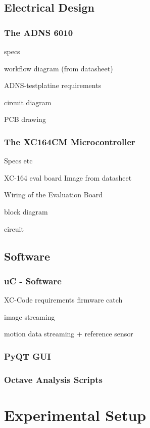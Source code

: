 \documentclass[12pt,a4paper]{article}
\begin{document}
\subsection{Electrical Design}

\subsubsection{The ADNS 6010}

specs

workflow diagram (from datasheet)

ADNS-testplatine
  requirements

  circuit diagram

  PCB drawing

\subsubsection{The XC164CM Microcontroller}

Specs etc

XC-164 eval board 
  Image from datasheet

Wiring of the Evaluation Board

  block diagram

  circuit

\subsection{Software}

\subsubsection{uC - Software}

  XC-Code
    requirements
    firmware catch

    image streaming

    motion data streaming
      + reference sensor

\subsubsection{PyQT GUI}

\subsubsection{Octave Analysis Scripts}

\section{Experimental Setup}
\end{document}
